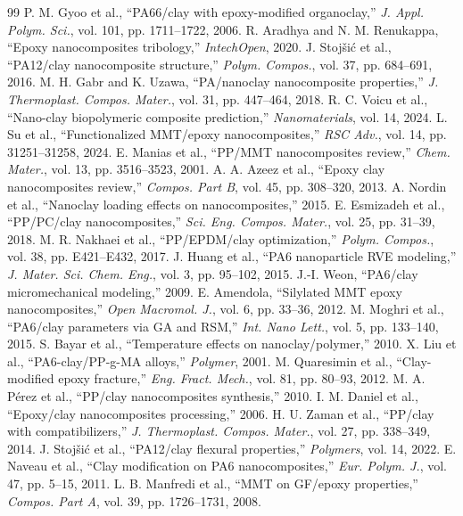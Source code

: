 \documentclass[conference]{IEEEtran}
\begin{document}
\begin{thebibliography}{99}
 P. M. Gyoo et al., ``PA66/clay with epoxy-modified organoclay,'' \emph{J. Appl. Polym. Sci.}, vol. 101, pp. 1711--1722, 2006.
 R. Aradhya and N. M. Renukappa, ``Epoxy nanocomposites tribology,'' \emph{IntechOpen}, 2020.
 J. Stoj\v{s}i\'{c} et al., ``PA12/clay nanocomposite structure,'' \emph{Polym. Compos.}, vol. 37, pp. 684--691, 2016.
 M. H. Gabr and K. Uzawa, ``PA/nanoclay nanocomposite properties,'' \emph{J. Thermoplast. Compos. Mater.}, vol. 31, pp. 447--464, 2018.
 R. C. Voicu et al., ``Nano-clay biopolymeric composite prediction,'' \emph{Nanomaterials}, vol. 14, 2024.
 L. Su et al., ``Functionalized MMT/epoxy nanocomposites,'' \emph{RSC Adv.}, vol. 14, pp. 31251--31258, 2024.
 E. Manias et al., ``PP/MMT nanocomposites review,'' \emph{Chem. Mater.}, vol. 13, pp. 3516--3523, 2001.
 A. A. Azeez et al., ``Epoxy clay nanocomposites review,'' \emph{Compos. Part B}, vol. 45, pp. 308--320, 2013.
 A. Nordin et al., ``Nanoclay loading effects on nanocomposites,'' 2015.
 E. Esmizadeh et al., ``PP/PC/clay nanocomposites,'' \emph{Sci. Eng. Compos. Mater.}, vol. 25, pp. 31--39, 2018.
 M. R. Nakhaei et al., ``PP/EPDM/clay optimization,'' \emph{Polym. Compos.}, vol. 38, pp. E421--E432, 2017.
 J. Huang et al., ``PA6 nanoparticle RVE modeling,'' \emph{J. Mater. Sci. Chem. Eng.}, vol. 3, pp. 95--102, 2015.
 J.-I. Weon, ``PA6/clay micromechanical modeling,'' 2009.
 E. Amendola, ``Silylated MMT epoxy nanocomposites,'' \emph{Open Macromol. J.}, vol. 6, pp. 33--36, 2012.
 M. Moghri et al., ``PA6/clay parameters via GA and RSM,'' \emph{Int. Nano Lett.}, vol. 5, pp. 133--140, 2015.
 S. Bayar et al., ``Temperature effects on nanoclay/polymer,'' 2010.
 X. Liu et al., ``PA6-clay/PP-g-MA alloys,'' \emph{Polymer}, 2001.
 M. Quaresimin et al., ``Clay-modified epoxy fracture,'' \emph{Eng. Fract. Mech.}, vol. 81, pp. 80--93, 2012.
 M. A. P\'{e}rez et al., ``PP/clay nanocomposites synthesis,'' 2010.
 I. M. Daniel et al., ``Epoxy/clay nanocomposites processing,'' 2006.
 H. U. Zaman et al., ``PP/clay with compatibilizers,'' \emph{J. Thermoplast. Compos. Mater.}, vol. 27, pp. 338--349, 2014.
 J. Stoj\v{s}i\'{c} et al., ``PA12/clay flexural properties,'' \emph{Polymers}, vol. 14, 2022.
 E. Naveau et al., ``Clay modification on PA6 nanocomposites,'' \emph{Eur. Polym. J.}, vol. 47, pp. 5--15, 2011.
 L. B. Manfredi et al., ``MMT on GF/epoxy properties,'' \emph{Compos. Part A}, vol. 39, pp. 1726--1731, 2008.

\end{thebibliography}
\end{document}
